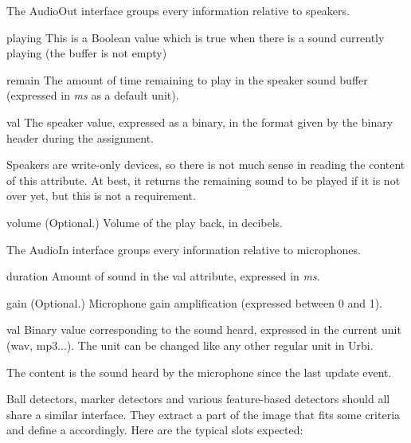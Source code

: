 The AudioOut interface groups every information relative to speakers.

\begin{urbiscriptapi}
\item[playing] This is a Boolean value which is true when there is a sound
  currently playing (the buffer is not empty)%


\item[remain] The amount of time remaining to play in the speaker sound
  buffer (expressed in \textit{ms} as a default unit).


\item[val] The speaker value, expressed as a binary, in the format given by
  the binary header during the assignment.

  Speakers are write-only devices, so there is not much sense in reading the
  content of this attribute. At best, it returns the remaining sound to be
  played if it is not over yet, but this is not a requirement.


\item[volume]{} (Optional.) Volume of the play back, in decibels.
\end{urbiscriptapi}




The AudioIn interface groups every information relative to microphones.

\begin{urbiscriptapi}
\item[duration] Amount of sound in the val attribute, expressed in
  \textit{ms}.


\item[gain]{} (Optional.) Microphone gain amplification (expressed between 0
  and 1).


\item[val] Binary value corresponding to the sound heard, expressed in the
  current unit (wav, mp3...). The unit can be changed like any other regular
  unit in Urbi.

  The content is the sound heard by the microphone since the last update
  event.
\end{urbiscriptapi}



Ball detectors, marker detectors and various feature-based detectors
should all share a similar interface. They extract a part of the image
that fits some criteria and define a  accordingly. Here are
the typical slots expected:

